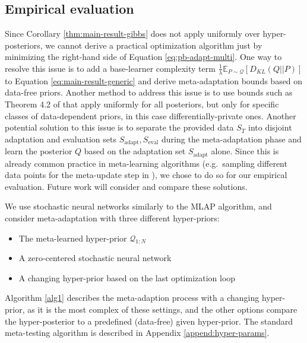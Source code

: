 \documentclass[letterpaper]{article} %
\theoremstyle{definition}
\newcommand{\Expect}[2]{\mathbb{E}_{#1}\left [#2 \right ]}
\begin{document}
\subsection{Empirical evaluation}

Since Corollary \ref{thm:main-result-gibbs} does not apply uniformly over hyper-posteriors, we cannot derive a practical optimization algorithm just by minimizing the right-hand side of  Equation \ref{eq:pb-adapt-multi}. 
One way to resolve this issue is to add a base-learner complexity term $\frac{1}{\lambda}\Expect{P\sim \mathcal{Q}}{D_{KL}(Q||P)}$ to Equation \ref{eq:main-result-generic} and derive meta-adaptation bounds based on data-free priors.
Another method to address this issue is to use bounds such as Theorem 4.2 of \citet{Dziugaite2018} that apply uniformly for all posteriors, but only for specific classes of data-dependent priors, in this case differentially-private ones.
Another potential solution to this issue is to separate the provided data $S_T$ into disjoint adaptation and evaluation sets $S_{\mathrm{adapt}},S_{\mathrm{eval}}$ during the meta-adaptation phase and learn the posterior $Q$ based on the adaptation set $S_{\mathrm{adapt}}$ alone. Since this is already common practice in meta-learning algorithms (e.g.\ sampling different data points for the meta-update step in \citet{Finn2017} ), we chose to do so for our empirical evaluation. Future work will consider and compare these solutions.

We use stochastic neural networks \citep{Graves2011, Blundell2015} similarly to the MLAP \citep{Amit2018} algorithm, and consider meta-adaptation with three different hyper-priors: 
\begin{itemize}
	\item The meta-learned hyper-prior $\mathcal{Q}_{1:N}$
	\item A zero-centered stochastic neural network
	\item A changing hyper-prior based on the last optimization loop
\end{itemize} 

Algorithm \ref{alg1} describes the meta-adaption process with a changing hyper-prior, as it is the most complex of these settings, and the other options compare the hyper-posterior to a predefined (data-free) given hyper-prior. The standard meta-testing algorithm is described in Appendix \ref{append:hyper-params}.
\end{document}
